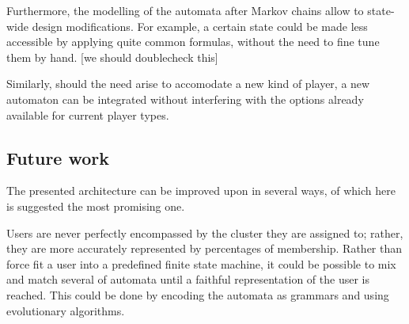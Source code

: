 \documentclass[conference]{IEEEtran}
\begin{document}
Furthermore, the modelling of the automata after Markov chains allow to state-wide design modifications. For example, a certain state could be made less accessible by applying quite common formulas, without the need to fine tune them by hand. [we should doublecheck this]

Similarly, should the need arise to accomodate a new kind of player, a new automaton can be integrated without interfering with the options already available for current player types.

\subsection*{Future work}

The presented architecture can be improved upon in several ways, of which here is suggested the most promising one.

Users are never perfectly encompassed by the cluster they are assigned to; rather, they are more accurately represented by percentages of membership. Rather than force fit a user into a predefined finite state machine, it could be possible to mix and match several of automata until a faithful representation of the user is reached. This could be done by encoding the automata as grammars and using evolutionary algorithms.



%

%




\end{document}
